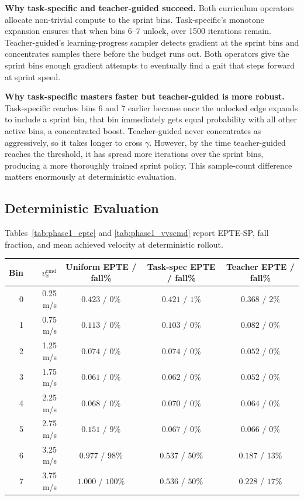 \documentclass[a4paper,11pt]{article}
\begin{document}
    \textbf{Why task-specific and teacher-guided succeed.} Both curriculum operators allocate non-trivial compute to the sprint bins. Task-specific's monotone expansion ensures that when bins 6--7 unlock, over 1500 iterations remain. Teacher-guided's learning-progress sampler detects gradient at the sprint bins and concentrates samples there before the budget runs out. Both operators give the sprint bins enough gradient attempts to eventually find a gait that steps forward at sprint speed.

    \textbf{Why task-specific masters faster but teacher-guided is more robust.} Task-specific reaches bins 6 and 7 earlier because once the unlocked edge expands to include a sprint bin, that bin immediately gets equal probability with all other active bins, a concentrated boost. Teacher-guided never concentrates as aggressively, so it takes longer to cross $\gamma$. However, by the time teacher-guided reaches the threshold, it has spread more iterations over the sprint bins, producing a more thoroughly trained sprint policy. This sample-count difference matters enormously at deterministic evaluation.

    \subsection{Deterministic Evaluation}

    Tables~\ref{tab:phase1_epte} and \ref{tab:phase1_vvscmd} report EPTE-SP, fall fraction, and mean achieved velocity at deterministic rollout.

    \begin{center}
    \begin{tabular}{@{}r r c c c@{}}
    \toprule
    \textbf{Bin} & $v_x^{\mathrm{cmd}}$ & \textbf{Uniform EPTE / fall\%} & \textbf{Task-spec EPTE / fall\%} & \textbf{Teacher EPTE / fall\%} \\
    \midrule
    0 & 0.25 m/s & $0.423$ / $0\%$   & $0.421$ / $1\%$   & $0.368$ / $2\%$  \\
    1 & 0.75 m/s & $0.113$ / $0\%$   & $0.103$ / $0\%$   & $0.082$ / $0\%$  \\
    2 & 1.25 m/s & $0.074$ / $0\%$   & $0.074$ / $0\%$   & $0.052$ / $0\%$  \\
    3 & 1.75 m/s & $0.061$ / $0\%$   & $0.062$ / $0\%$   & $0.052$ / $0\%$  \\
    4 & 2.25 m/s & $0.068$ / $0\%$   & $0.070$ / $0\%$   & $0.064$ / $0\%$  \\
    5 & 2.75 m/s & $0.151$ / $9\%$   & $0.067$ / $0\%$   & $0.066$ / $0\%$  \\
    6 & 3.25 m/s & $0.977$ / $98\%$  & $0.537$ / $50\%$  & $0.187$ / $13\%$ \\
    7 & 3.75 m/s & $1.000$ / $100\%$ & $0.536$ / $50\%$  & $0.228$ / $17\%$ \\
    \bottomrule
    \end{tabular}
    \label{tab:phase1_epte}
    \end{center}
\end{document}
